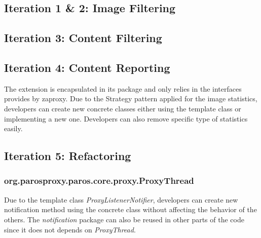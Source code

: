 \subsection{Iteration 1 \& 2: Image Filtering}
\subsection{Iteration 3: Content Filtering}
\subsection{Iteration 4: Content Reporting}
The extension is encapsulated in its package and only relies in the interfaces provides by zaproxy. Due to the Strategy pattern applied for the image statistics, developers can create new concrete classes either using the template class or implementing a new one. Developers can also remove specific type of statistics easily.

\subsection{Iteration 5: Refactoring}

\subsubsection{org.parosproxy.paros.core.proxy.ProxyThread}

Due to the template class \textit{ProxyListenerNotifier}, developers can create new notification method using the concrete class without affecting the behavior of the others. The \textit{notification} package can also be reused in other parts of the code since it does not depends on \textit{ProxyThread}. 